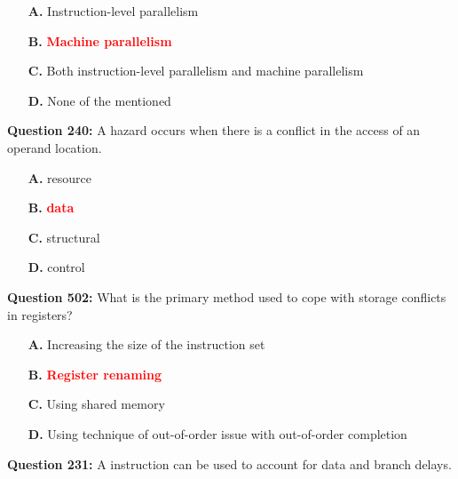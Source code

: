 \documentclass[12pt,a4paper]{article}
\begin{document}
\begin{itemize}
    \item[\textbf{A.}] Instruction-level parallelism
    \item[\textbf{B.}] \textcolor{red}{\textbf{Machine parallelism}}
    \item[\textbf{C.}] Both instruction-level parallelism and machine parallelism
    \item[\textbf{D.}] None of the mentioned
\end{itemize}

\vspace{0.5cm}

\vspace{0.5cm}

\textbf{Question 240:} A \underline{\hspace{1.5cm}} hazard occurs when there is a conflict in the access of an operand location.

\begin{itemize}
    \item[\textbf{A.}] resource
    \item[\textbf{B.}] \textcolor{red}{\textbf{data}}
    \item[\textbf{C.}] structural
    \item[\textbf{D.}] control
\end{itemize}

\vspace{0.5cm}

\vspace{0.5cm}

\textbf{Question 502:} What is the primary method used to cope with storage conflicts in registers?

\begin{itemize}
    \item[\textbf{A.}] Increasing the size of the instruction set
    \item[\textbf{B.}] \textcolor{red}{\textbf{Register renaming}}
    \item[\textbf{C.}] Using shared memory
    \item[\textbf{D.}] Using technique of out-of-order issue with out-of-order completion
\end{itemize}

\vspace{0.5cm}

\vspace{0.5cm}

\textbf{Question 231:} A \underline{\hspace{1.5cm}} instruction can be used to account for data and branch delays.
\end{document}
